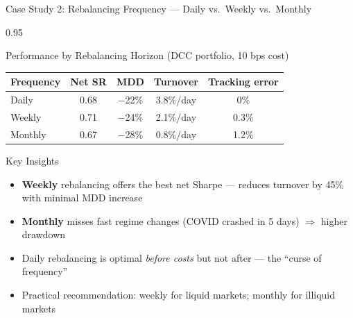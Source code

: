 \documentclass[9pt, aspectratio=169, t]{beamer}
\begin{document}
\begin{frame}{Case Study 2: Rebalancing Frequency --- Daily vs.\ Weekly vs.\ Monthly}
    \begin{cminipage}{0.95\textwidth}
    {\footnotesize
    \begin{block}{Performance by Rebalancing Horizon (DCC portfolio, 10 bps cost)}
        \vspace{0.1cm}
        {\small
        \begin{center}
        \begin{tabular}{l|cccc}
            \hline
            \textbf{Frequency} & \textbf{Net SR} & \textbf{MDD} & \textbf{Turnover} & \textbf{Tracking error} \\
            \hline
            Daily    & 0.68 & $-$22\% & 3.8\%/day & 0\% \\
            Weekly   & 0.71 & $-$24\% & 2.1\%/day & 0.3\% \\
            Monthly  & 0.67 & $-$28\% & 0.8\%/day & 1.2\% \\
            \hline
        \end{tabular}
        \end{center}
        }
    \end{block}
    \begin{alertblock}{Key Insights}
        \begin{itemize}\setlength{\itemsep}{0pt}
            \item \textbf{Weekly} rebalancing offers the best net Sharpe --- reduces turnover by 45\% with minimal MDD increase
            \item \textbf{Monthly} misses fast regime changes (COVID crashed in 5 days) $\Rightarrow$ higher drawdown
            \item Daily rebalancing is optimal \textit{before costs} but not after --- the ``curse of frequency''
            \item Practical recommendation: weekly for liquid markets; monthly for illiquid markets
        \end{itemize}
    \end{alertblock}
    }
    \end{cminipage}
\end{frame}
\end{document}
